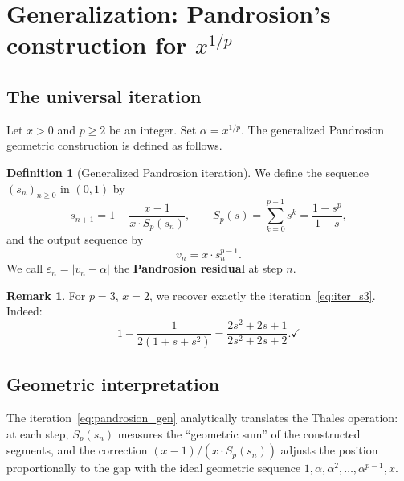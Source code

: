 \documentclass[11pt,a4paper]{article}
\theoremstyle{definition}
\newtheorem{definition}{Definition}[section]
\newtheorem{remark}{Remark}[section]
\newcommand{\eps}{\varepsilon}
\begin{document}
\section{Generalization: Pandrosion's construction for \texorpdfstring{$x^{1/p}$}{x\^{}(1/p)}}
\label{sec:generalisation}

\subsection{The universal iteration}

Let $x > 0$ and $p \geq 2$ be an integer. Set $\alpha = x^{1/p}$. The generalized Pandrosion geometric construction is defined as follows.

\begin{definition}[Generalized Pandrosion iteration]
\label{def:pandrosion_gen}
We define the sequence $(s_n)_{n \geq 0}$ in $(0, 1)$ by
\begin{equation}
  \label{eq:pandrosion_gen}
  s_{n+1} = 1 - \frac{x - 1}{x \cdot S_p(s_n)},
  \qquad
  S_p(s) = \sum_{k=0}^{p-1} s^k = \frac{1 - s^p}{1 - s},
\end{equation}
and the output sequence by
\begin{equation}
  \label{eq:vn_gen}
  v_n = x \cdot s_n^{p-1}.
\end{equation}
We call $\eps_n = |v_n - \alpha|$ the \textbf{Pandrosion residual} at step $n$.
\end{definition}

\begin{remark}
For $p = 3$, $x = 2$, we recover exactly the iteration~\eqref{eq:iter_s3}. Indeed:
\[
  1 - \frac{1}{2(1+s+s^2)} = \frac{2s^2+2s+1}{2s^2+2s+2}. \checkmark
\]
\end{remark}

\subsection{Geometric interpretation}

The iteration~\eqref{eq:pandrosion_gen} analytically translates the Thales operation: at each step, $S_p(s_n)$ measures the ``geometric sum'' of the constructed segments, and the correction $(x-1)/(x \cdot S_p(s_n))$ adjusts the position proportionally to the gap with the ideal geometric sequence $1, \alpha, \alpha^2, \ldots, \alpha^{p-1}, x$.
\end{document}
